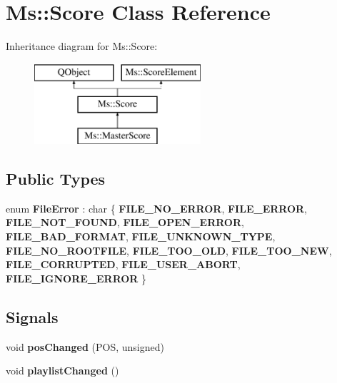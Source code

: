 \hypertarget{class_ms_1_1_score}{}\section{Ms\+:\+:Score Class Reference}
\label{class_ms_1_1_score}
Inheritance diagram for Ms\+:\+:Score\+:\begin{figure}[H]
\begin{center}
\leavevmode
\includegraphics[height=3.000000cm]{class_ms_1_1_score}
\end{center}
\end{figure}
\subsection*{Public Types}
\begin{DoxyCompactItemize}
\item 
\mbox{\label{class_ms_1_1_score_a8d59eafa85868a96e516b4f3acc03b4d}} 
enum {\bfseries File\+Error} \+: char \{ \newline
{\bfseries F\+I\+L\+E\+\_\+\+N\+O\+\_\+\+E\+R\+R\+OR}, 
{\bfseries F\+I\+L\+E\+\_\+\+E\+R\+R\+OR}, 
{\bfseries F\+I\+L\+E\+\_\+\+N\+O\+T\+\_\+\+F\+O\+U\+ND}, 
{\bfseries F\+I\+L\+E\+\_\+\+O\+P\+E\+N\+\_\+\+E\+R\+R\+OR}, 
\newline
{\bfseries F\+I\+L\+E\+\_\+\+B\+A\+D\+\_\+\+F\+O\+R\+M\+AT}, 
{\bfseries F\+I\+L\+E\+\_\+\+U\+N\+K\+N\+O\+W\+N\+\_\+\+T\+Y\+PE}, 
{\bfseries F\+I\+L\+E\+\_\+\+N\+O\+\_\+\+R\+O\+O\+T\+F\+I\+LE}, 
{\bfseries F\+I\+L\+E\+\_\+\+T\+O\+O\+\_\+\+O\+LD}, 
\newline
{\bfseries F\+I\+L\+E\+\_\+\+T\+O\+O\+\_\+\+N\+EW}, 
{\bfseries F\+I\+L\+E\+\_\+\+C\+O\+R\+R\+U\+P\+T\+ED}, 
{\bfseries F\+I\+L\+E\+\_\+\+U\+S\+E\+R\+\_\+\+A\+B\+O\+RT}, 
{\bfseries F\+I\+L\+E\+\_\+\+I\+G\+N\+O\+R\+E\+\_\+\+E\+R\+R\+OR}
 \}
\end{DoxyCompactItemize}
\subsection*{Signals}
\begin{DoxyCompactItemize}
\item 
\mbox{\label{class_ms_1_1_score_a5eca553f5139e4255c50b6948627d7df}} 
void {\bfseries pos\+Changed} (P\+OS, unsigned)
\item 
\mbox{\label{class_ms_1_1_score_ace6ac838e61971b8e8fb3b9d2238c5a4}} 
void {\bfseries playlist\+Changed} ()
\end{DoxyCompactItemize}
